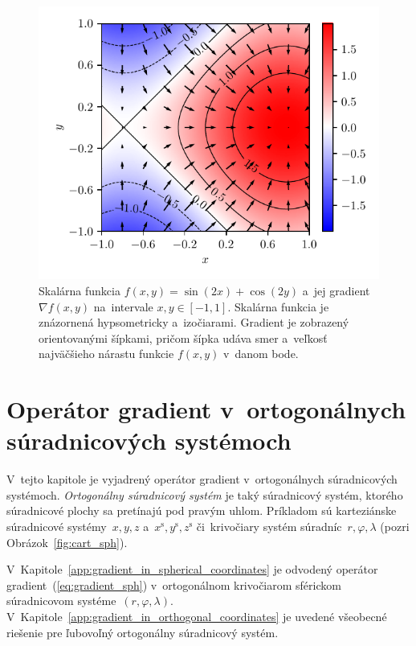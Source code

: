 \documentclass[a4paper, 12pt]{book}
\begin{document}
\begin{figure}[bt]
\centering
\includegraphics{./fig-gradient.pdf}
\caption{Skalárna funkcia $f(x, y) = \sin(2x) + \cos(2y)$ a~jej gradient 
$\nabla f(x, y)$ na~intervale $x, y \in [-1, 1]$.  Skalárna funkcia je 
znázornená hypsometricky a~izočiarami.  Gradient je zobrazený orientovanými 
šípkami, pričom šípka udáva smer a~veľkosť najväčšieho nárastu funkcie $f(x, 
y)$ v~danom bode.}
\label{fig:f_gradf}
\end{figure}






\chapter{Operátor gradient v~ortogonálnych súradnicových systémoch}
\label{app:gradient_in_orthogonal_systems}

V~tejto kapitole je vyjadrený operátor gradient v~ortogonálnych súradnicových 
systémoch.  \emph{Ortogonálny súradnicový systém} je taký súradnicový systém, 
ktorého súradnicové plochy sa pretínajú pod pravým uhlom.  Príkladom sú 
karteziánske súradnicové systémy~$x, y, z$ a~$x^\mathrm{s}, y^\mathrm{s}, 
z^\mathrm{s}$ či~krivočiary systém súradníc~$r, \varphi, \lambda$ (pozri 
Obrázok~\ref{fig:cart_sph}).

V~Kapitole~\ref{app:gradient_in_spherical_coordinates} je odvodený operátor 
gradient~(\ref{eq:gradient_sph}) v~ortogonálnom krivočiarom sférickom 
súradnicovom systéme~$(r, \varphi, \lambda)$.  
V~Kapitole~\ref{app:gradient_in_orthogonal_coordinates} je uvedené všeobecné 
riešenie pre ľubovoľný ortogonálny súradnicový systém.
\end{document}
